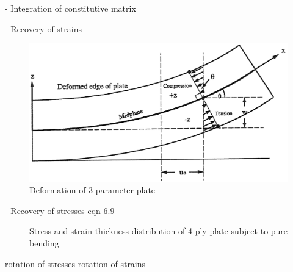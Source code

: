 - Integration of constitutive matrix


- Recovery of strains
\begin{figure}[H]
	\centering
	\def\svgwidth{\columnwidth}
	\includegraphics[width=12cm]{images/composite_nasa_strains.png}
	\caption{Deformation of 3 parameter plate \cite{nasanettles1994}}
	\label{fig:compositenasastrains}
\end{figure}

- Recovery of stresses 
\cite{agarwal2006analysis} eqn 6.9
\begin{figure}[H]
	\caption{\label{composite_stress_strain}Stress and strain thickness distribution of 4 ply plate subject to pure bending  \cite{nasanettles1994}}
\end{figure}

rotation of stresses
rotation of strains